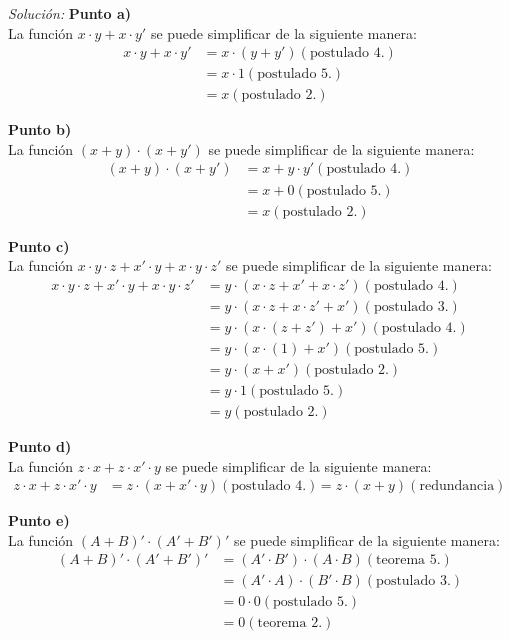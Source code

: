 \documentclass{article}
\newenvironment{solution}
    {\textit{Solución:}}
    {}
\begin{document}
\begin{solution}
\textbf{Punto a)}\\
La función $x \cdot y + x \cdot y'$ se puede simplificar de la siguiente manera:
\begin{align*}
    x \cdot y + x \cdot y' &= x \cdot (y + y') (\text{postulado 4.}) \\
    &= x \cdot 1 (\text{postulado 5.}) \\
    &= x (\text{postulado 2.})
\end{align*}

\textbf{Punto b)}\\
La función $( x + y ) \cdot ( x + y')$ se puede simplificar de la siguiente manera:
\begin{align*}
    ( x + y ) \cdot ( x + y') &= x + y\cdot y' (\text{postulado 4.}) \\
    &= x + 0 (\text{postulado 5.}) \\
    &= x (\text{postulado 2.}) 
\end{align*}

\textbf{Punto c)}\\
La función $x\cdot y \cdot z + x' \cdot y + x \cdot y \cdot z'$ se puede simplificar de la siguiente manera:
\begin{align*}
    x\cdot y \cdot z + x' \cdot y + x \cdot y \cdot z' &= y \cdot (x \cdot z + x' + x \cdot z') (\text{postulado 4.}) \\
    &= y \cdot (x \cdot z + x \cdot z' + x') (\text{postulado 3.}) \\
    &= y \cdot (x \cdot ( z + z') + x') (\text{postulado 4.}) \\
    &= y \cdot (x \cdot (1) + x') (\text{postulado 5.}) \\
    &= y \cdot (x + x') (\text{postulado 2.}) \\
    &= y \cdot 1 (\text{postulado 5.}) \\
    &= y (\text{postulado 2.})
\end{align*}

\textbf{Punto d)}\\
La función $z \cdot x + z \cdot x' \cdot y$ se puede simplificar de la siguiente manera:
\begin{align*}
    z \cdot x + z \cdot x' \cdot y &= z \cdot (x + x' \cdot y) (\text{postulado 4.}) 
    &= z \cdot (x+y) (\text{redundancia})
\end{align*}

\textbf{Punto e)}\\
La función $(A+B)' \cdot (A' + B')'$ se puede simplificar de la siguiente manera:
\begin{align*}
    (A+B)' \cdot (A' + B')' &= (A' \cdot B') \cdot (A \cdot B) (\text{teorema 5.}) \\
    &= (A' \cdot A) \cdot (B' \cdot B) (\text{postulado 3.}) \\
    &= 0 \cdot 0 (\text{postulado 5.}) \\
    &= 0 (\text{teorema 2.})
\end{align*}


\end{solution}
\end{document}
